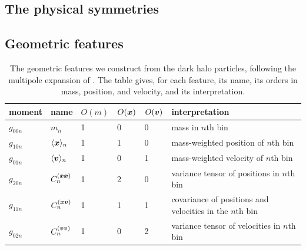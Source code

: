\subsection{The physical symmetries}
\label{sec:symmetries}


\subsection{Geometric features}
\label{sec:geometric_features}

\begin{table}
    \caption{The geometric features we construct from the dark halo particles, following the multipole expansion of . The table gives, for each feature, its name, its orders in mass, position, and velocity, and its interpretation.   }
    \label{tbl:geometric_features}
    \vspace{0.5em}
    \centering
    \begin{tabular}{|l|l|l|l|l|l|}
    \hline
    moment & name & $O(m)$ & $O(\bm{x})$ & $O(\bm{v})$ & interpretation \\
    \hline
    $g_{00n}$ & $m_n$ & 1 & 0 & 0 & mass in $n$th bin \\
    $g_{10n}$ & $\langle \bm{x} \rangle_n$ & 1 & 1 & 0 & mass-weighted position of $n$th bin \\
    $g_{01n}$ & $\langle \bm{v} \rangle_n$ & 1 & 0 & 1 & mass-weighted velocity of $n$th bin \\
    $g_{20n}$ & $C^{(\bm{x}\bm{x})}_n$ & 1 & 2 & 0 & variance tensor of positions in $n$th bin \\
    $g_{11n}$ & $C^{(\bm{x}\bm{v})}_n$ & 1 & 1 & 1 & covariance of positions and velocities in the $n$th bin \\
    $g_{02n}$ & $C^{(\bm{v}\bm{v})}_n$ & 1 & 0 & 2 & variance tensor of velocities in $n$th bin \\
    \hline
    \end{tabular}
\end{table}

